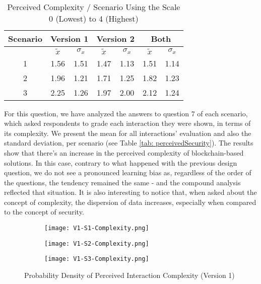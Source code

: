 \begin{table}[htb]
	\centering
	\caption{Perceived Complexity / Scenario Using the Scale 0 (Lowest) to 4 (Highest)}
	\label{tab: perceivedComplexity}
	\begin{tabular}{c|cc|cc|cc}
		\hline
		Scenario & \multicolumn{2}{c}{\bf Version 1} \vrule & \multicolumn{2}{c}{\bf Version 2} \vrule & \multicolumn{2}{c}{\bf Both}                                             \\
		\hline
		         & $\tilde{x}$                              & $\sigma_{x}$                             & $\tilde{x}$                  & $\sigma_{x}$ & $\tilde{x}$ & $\sigma_{x}$ \\
		\hline
		1        & 1.56                                     & 1.51                                     & 1.47                         & 1.13         & 1.51        & 1.14         \\
		\hline
		2        & 1.96                                     & 1.21                                     & 1.71                         & 1.25         & 1.82        & 1.23         \\
		\hline
		3        & 2.25                                     & 1.26                                     & 1.97                         & 2.00         & 2.12        & 1.24         \\
		\hline
	\end{tabular}
\end{table}

For this question, we have analyzed the answers to question 7 of each scenario, which asked respondents to grade each interaction they were shown, in terms of its complexity. We present the mean for all interactions' evaluation and also the standard deviation, per scenario (see Table \ref{tab: perceivedSecurity}). The results show that there's an increase in the perceived complexity of blockchain-based solutions. In this case, contrary to what happened with the previous design question, we do not see a pronounced learning bias as, regardless of the order of the questions, the tendency remained the same - and the compound analysis reflected that situation. It is also interesting to notice that, when asked about the concept of complexity, the dispersion of data increases, especially when compared to the concept of security.

\begin{figure}[htb]
	\centering
	\begin{subfigure}[b]{0.49\textwidth}
		\centering
		\texttt{[image: V1-S1-Complexity.png]}
	\end{subfigure}
	\begin{subfigure}[b]{0.49\textwidth}
		\centering
		\texttt{[image: V1-S2-Complexity.png]}
	\end{subfigure}
	\hfill
	\begin{subfigure}[b]{0.49\textwidth}
		\centering
		\texttt{[image: V1-S3-Complexity.png]}
	\end{subfigure}

	\caption{Probability Density of Perceived Interaction Complexity (Version 1)}
	\label{fig: perceivedInteractionComplexityOne}
\end{figure}


